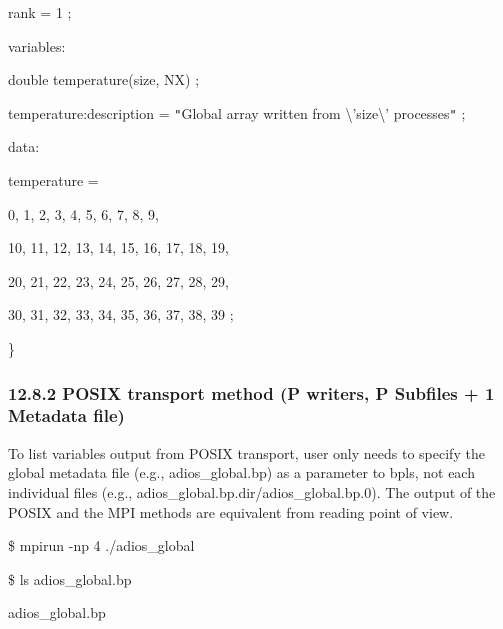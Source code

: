 \vspace{10pt}
\parindent=57pt
rank = 1 ;

\vspace{10pt}
\parindent=0pt
variables:

\vspace{10pt}
\parindent=28pt
double temperature(size, NX) ;

\vspace{10pt}
\parindent=57pt
temperature:description = \texttt{"}Global array written from \textbackslash{}'size\textbackslash{}' 
processes\texttt{"} ;

\vspace{10pt}
\parindent=0pt
data:

\vspace{22pt}
\parindent=3pt
temperature =

\vspace{10pt}
\parindent=7pt
0, 1, 2, 3, 4, 5, 6, 7, 8, 9,

\vspace{10pt}
10, 11, 12, 13, 14, 15, 16, 17, 18, 19,

\vspace{10pt}
\parindent=14pt
20, 21, 22, 23, 24, 25, 26, 27, 28, 29,

\vspace{10pt}
\parindent=7pt
30, 31, 32, 33, 34, 35, 36, 37, 38, 39 ;

\vspace{10pt}
\parindent=0pt
\}\label{HToc182553449}

\vspace{10pt}
\subsubsection*{{\large \textbf{12.8.2 POSIX transport method (P writers, P Subfiles 
+ 1 Metadata file)}}}

\vspace{10pt}
To list variables output from POSIX transport, user only needs to specify the global 
metadata file (e.g., adios\_global.bp) as a parameter to bpls, not each individual 
files (e.g., adios\_global.bp.dir/adios\_global.bp.0). The output of the POSIX 
and the MPI methods are equivalent from reading point of view. 

\vspace{10pt}
\$ mpirun -np 4 ./adios\_global

\vspace{10pt}
\$ ls adios\_global.bp 

\vspace{10pt}
adios\_global.bp

